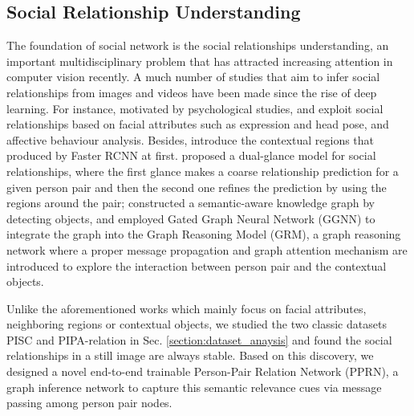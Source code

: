 \documentclass{article}
\newcommand{\PPRN}{{\sf PPRN}}
\begin{document}
\subsection{Social Relationship Understanding}

The foundation of social network is the social relationships understanding, an important multidisciplinary problem that has attracted increasing attention in computer vision recently. A much number of studies that aim to infer social relationships from images \cite{DBLP:conf/iccv/LiWZK17,DBLP:conf/ijcai/WangCRYCL18,DBLP:conf/eccv/WangGLF10,DBLP:conf/iccv/ZhangLLT15} and videos \cite{DBLP:conf/eccv/DingY10,DBLP:conf/cvpr/RamanathanY013,DBLP:journals/ivc/VinciarelliPB09} have been made since the rise of deep learning. For instance, motivated by psychological studies, \cite{DBLP:conf/iccv/ZhangLLT15} and \cite{DBLP:conf/iccv/DibekliogluSG13} exploit social relationships based on facial attributes such as expression and head pose, and affective behaviour analysis. 
Besides, \cite{DBLP:conf/iccv/LiWZK17} introduce the contextual regions that produced by Faster RCNN\cite{DBLP:conf/nips/RenHGS15} at first.
\cite{DBLP:conf/iccv/LiWZK17} proposed a dual-glance model for social relationships, where the first glance makes a coarse relationship prediction for a given person pair and then the second one refines the prediction by using the regions around the pair; \cite{DBLP:conf/ijcai/WangCRYCL18} constructed a semantic-aware knowledge graph by detecting objects, and employed Gated Graph Neural Network (GGNN) \cite{DBLP:journals/tomccap/LiSKJZW15} to integrate the graph into the Graph Reasoning Model (GRM), a graph reasoning network where a proper message propagation and graph attention mechanism are introduced to explore the interaction between person pair and the contextual objects.

Unlike the aforementioned works which mainly focus on facial attributes, neighboring regions or contextual objects, we studied the two classic datasets PISC \cite{DBLP:conf/iccv/LiWZK17} and PIPA-relation \cite{DBLP:conf/cvpr/SunSF17} in Sec. \ref{section:dataset_anaysis} and found the social relationships in a still image are always stable. Based on this discovery, we designed a novel end-to-end trainable Person-Pair Relation Network (\PPRN), a graph inference network to capture this semantic relevance cues via message passing among person pair nodes.
\end{document}
